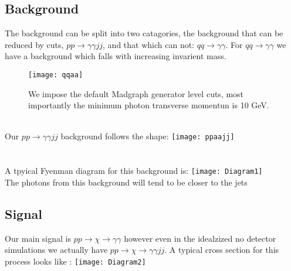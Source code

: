 \documentclass[twocolumn]{article}
\begin{document}
\subsection{Background} 
The background can be split into two catagories, the background that can be reduced by cuts, \begin{math} p p  \rightarrow \gamma \gamma j j \end{math}, and that which can not:  \begin{math} q q \rightarrow \gamma \gamma \end{math}. For  \begin{math} qq \rightarrow \gamma \gamma \end{math} we have a background which falls with increasing invarient mass. \begin{figure}[h]\texttt{[image: qqaa]} \caption{We impose the default Madgraph generator level cuts, most importantly the minimum photon transverse momentun is 10 GeV.} \end{figure} \\
 Our \begin{math} p p  \rightarrow \gamma \gamma j j \end{math} background follows the shape:  \texttt{[image: ppaajj]}
\\
\\
\\
A tpyical Fyenman diagram for this background is: \texttt{[image: Diagram1]}
\\
The photons from this background will tend to be closer to the jets
\subsection{Signal}
Our main signal is \begin{math} p p \rightarrow \chi \rightarrow \gamma \gamma \end{math} however even in the idealzized no detector simulations we actually have  \begin{math} p p \rightarrow \chi \rightarrow \gamma \gamma j j \end{math}. A typical cross section for this process looks like :
\texttt{[image: Diagram2]} 
\\
\end{document}
